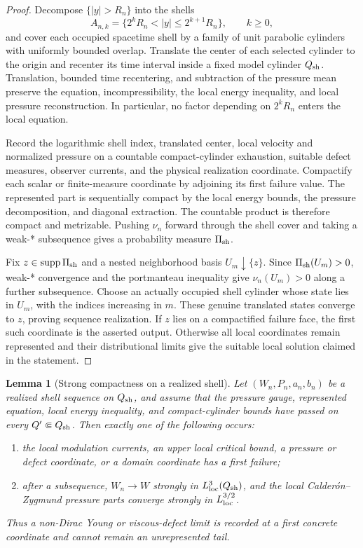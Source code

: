 \documentclass[11pt]{amsart}
\numberwithin{equation}{section}
\theoremstyle{plain}
\newtheorem{lemma}[lemma]{Lemma}
\theoremstyle{definition}
\theoremstyle{remark}
\begin{document}
\begin{proof}
Decompose \(\{|y|>R_n\}\) into the shells
\[
 A_{n,k}=\{2^kR_n<|y|\le2^{k+1}R_n\},\qquad k\ge0,
\]
and cover each occupied spacetime shell by a family of unit parabolic
cylinders with uniformly bounded overlap.  Translate the center of each
selected cylinder to the origin and recenter its time interval inside a fixed
model cylinder \(Q_{\rm sh}\).  Translation, bounded time recentering, and
subtraction of the pressure mean preserve the equation, incompressibility,
the local energy inequality, and local pressure reconstruction.  In
particular, no factor depending on \(2^kR_n\) enters the local equation.

Record the logarithmic shell index, translated center, local velocity and
normalized pressure on a countable compact-cylinder exhaustion, suitable
defect measures, observer currents, and the physical realization coordinate.
Compactify each scalar or finite-measure coordinate by adjoining its first
failure value.  The represented part is sequentially compact by the local
energy bounds, the pressure decomposition, and diagonal extraction.  The
countable product is therefore compact and metrizable.  Pushing \(\nu_n\)
forward through the shell cover and taking a weak-* subsequence gives a
probability measure \(\Pi_{\rm sh}\).

Fix \(z\in\operatorname{supp}\Pi_{\rm sh}\) and a nested neighborhood basis
\(U_m\downarrow\{z\}\).  Since \(\Pi_{\rm sh}(U_m)>0\), weak-* convergence and
the portmanteau inequality give \(\nu_{n}(U_m)>0\) along a further subsequence.
Choose an actually occupied shell cylinder whose state lies in \(U_m\), with
the indices increasing in \(m\).  These genuine translated states converge to
\(z\), proving sequence realization.  If \(z\) lies on a compactified failure
face, the first such coordinate is the asserted output.  Otherwise all local
coordinates remain represented and their distributional limits give the
suitable local solution claimed in the statement.
\end{proof}

\begin{lemma}[Strong compactness on a realized shell]
\label{lem:realized-shell-strong-compactness}
Let \((W_n,P_n,a_n,b_n)\) be a realized shell sequence on \(Q_{\rm sh}\), and
assume that the pressure gauge, represented equation, local energy inequality,
and compact-cylinder bounds have passed on every \(Q'\Subset Q_{\rm sh}\).
Then exactly one of the following occurs:
\begin{enumerate}[label=\textup{(\roman*)},leftmargin=2.2em]
\item the local modulation currents, an upper local critical bound, a pressure
or defect coordinate, or a domain coordinate has a first failure;
\item after a subsequence, \(W_n\to W\) strongly in
\(L^3_{\rm loc}(Q_{\rm sh})\), and the local Calder\'on--Zygmund pressure parts
converge strongly in \(L^{3/2}_{\rm loc}\).
\end{enumerate}
Thus a non-Dirac Young or viscous-defect limit is recorded at a first concrete
coordinate and cannot remain an unrepresented tail.
\end{lemma}
\end{document}
